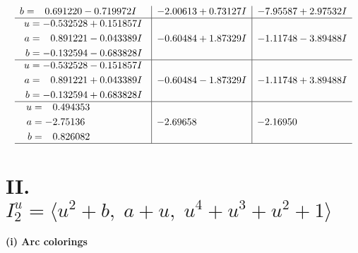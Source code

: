 \documentclass[1p]{elsarticle_modified}
\theoremstyle{definition}
\begin{document}
$$\begin{array}{c|c|c}
\begin{aligned}
b &= \phantom{-}0.691220 - 0.719972 I\end{aligned}
 & -2.00613 + 0.73127 I & -7.95587 + 2.97532 I \\ \hline\begin{aligned}
u &= -0.532528 + 0.151857 I \\
a &= \phantom{-}0.891221 - 0.043389 I \\
b &= -0.132594 - 0.683828 I\end{aligned}
 & -0.60484 + 1.87329 I & -1.11748 - 3.89488 I \\ \hline\begin{aligned}
u &= -0.532528 - 0.151857 I \\
a &= \phantom{-}0.891221 + 0.043389 I \\
b &= -0.132594 + 0.683828 I\end{aligned}
 & -0.60484 - 1.87329 I & -1.11748 + 3.89488 I \\ \hline\begin{aligned}
u &= \phantom{-}0.494353\phantom{ +0.000000I} \\
a &= -2.75136\phantom{ +0.000000I} \\
b &= \phantom{-}0.826082\phantom{ +0.000000I}\end{aligned}
 & -2.69658\phantom{ +0.000000I} & -2.16950\phantom{ +0.000000I}\\
 \hline 
 \end{array}$$\newpage\newpage\renewcommand{\arraystretch}{1}
\centering \section*{II. $I^u_{2}= \langle u^2+b,\;a+u,\;u^4+u^3+u^2+1 \rangle$}
\flushleft \textbf{(i) Arc colorings}\\
\end{document}
